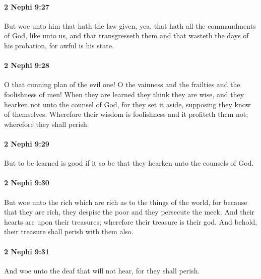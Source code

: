 		\paragraph{2 Nephi 9:27} %
			\label{2NEPHI-9-27}

			But woe unto him that hath the law given,
			yea, that hath all the commandments of God, like unto us,
			and that transgresseth them and that wasteth the days of his probation,
			for awful is his state.

		\paragraph{2 Nephi 9:28} %
			\label{2NEPHI-9-28}

			O that cunning plan of the evil one!
			O the vainness and the frailties and the foolishness of men!
			When they are learned they think they are wise,
			and they hearken not unto the counsel of God,
			for they set it aside, supposing they know of themselves.
			Wherefore their wisdom is foolishness and it profiteth them not;
			wherefore they shall perish.

		\paragraph{2 Nephi 9:29} %
			\label{2NEPHI-9-29}

			But to be learned is good
			if it so be that they hearken unto the counsels of God.

		\paragraph{2 Nephi 9:30} %
			\label{2NEPHI-9-30}

			But woe unto the rich which are rich as to the things of the world,
			for because that they are rich, they despise the poor and they persecute the meek.
			And their hearts are upon their treasures;
			wherefore their treasure is their god.
			And behold, their treasure shall perish with them also.

		\paragraph{2 Nephi 9:31} %
			\label{2NEPHI-9-31}

			And woe unto the deaf that will not hear,
			for they shall perish.

